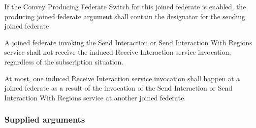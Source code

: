 \begin{compactstdpage}
    If the Convey Producing Federate Switch for this joined federate is enabled, the producing joined federate argument shall contain the designator for the sending joined federate


    A joined federate invoking the Send Interaction or Send Interaction With Regions service shall not receive the induced Receive Interaction \rtiinitiated{} service invocation, regardless of the subscription situation.


    At most, one induced Receive Interaction \rtiinitiated{} service invocation shall happen at a joined federate as a result of the invocation of the Send Interaction or Send Interaction With Regions service at another joined federate.

    \subsubsection{Supplied arguments}



\end{compactstdpage}

\clearpage

